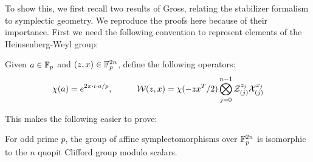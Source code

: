 To show this, we  first recall two results of Gross, relating the stabilizer formalism to symplectic geometry.  We reproduce the  proofs here because of their importance.  First we need the following convention to represent elements of the Heinsenberg-Weyl group:
\begin{definition}
Given $a \in \mathbb{F}_p$ and $(z,x )\in \mathbb{F}_p^{2n}$, define the following operators:
$$
\chi(a) = e^{2\pi\cdot i \cdot a/p}, \hspace*{1cm} {\mathcal W}(z,x)=\chi(-zx^T/2)\bigotimes_{j=0}^{n-1}\mathcal{Z}_{(j)}^{z_j}\mathcal{X}_{(j)}^{x_j}
$$
\end{definition}
This makes the following easier to prove:
\begingroup\allowdisplaybreaks
\begin{lemma}
For odd prime $p$, the group of affine symplectomorphisms over  $\mathbb{F}_p^{2n}$ is isomorphic to the $n$ quopit Clifford group modulo scalars.
\end{lemma}
